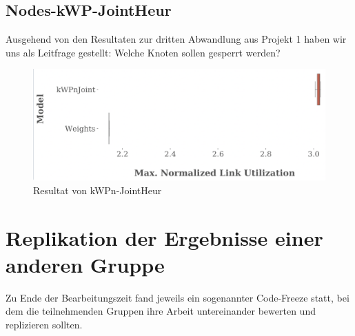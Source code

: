 \documentclass[sigconf,noacm,review]{acmart}
\begin{document}
\subsection{Nodes-kWP-JointHeur}

Ausgehend von den Resultaten zur dritten Abwandlung aus Projekt 1 haben wir uns als Leitfrage gestellt: Welche Knoten sollen gesperrt werden?

\begin{figure}[h]
  \centering
  \includegraphics[width=\linewidth]{abbildungen/kWPnJoint.png}
  \caption{Resultat von kWPn-JointHeur}
\end{figure}


\section{Replikation der Ergebnisse einer anderen Gruppe}
Zu Ende der Bearbeitungszeit fand jeweils ein sogenannter Code-Freeze statt, bei dem die teilnehmenden Gruppen ihre Arbeit untereinander bewerten und replizieren sollten. 
\end{document}
